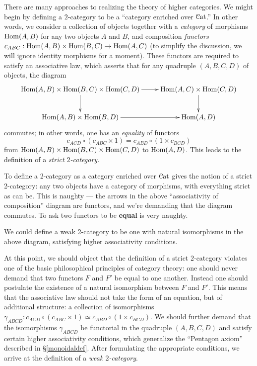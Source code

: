 There are many approaches to realizing the theory of higher categories.
We might begin by defining a $2$-category to be a
``category enriched over $\operatorname{\mathcal{C}at}$.'' In other words, we consider a
collection of objects together with a {\em category} of morphisms
$\operatorname{Hom}(A,B)$ for any two objects $A$ and $B$, and composition {\em
functors} $c_{ABC}: \operatorname{Hom}(A,B) \times \operatorname{Hom}(B,C) \rightarrow
\operatorname{Hom}(A,C)$ (to simplify the discussion, we will ignore identity
morphisms for a moment). These functors are required to satisfy an
associative law, which asserts that for any quadruple $(A,B,C,D)$
of objects, the diagram
$$ \xymatrix{ \Hom(A,B) \times \Hom(B,C) \times \Hom(C,D) \ar[d]
 \ar[r] & \Hom(A,C) \times \Hom(C,D) \ar[d] \\
 \Hom(A,B) \times \Hom(B,D) \ar[r] & \Hom(A,D) }$$
 commutes; in other words, one has an {\em equality} of functors
$$c_{ACD} \circ (c_{ABC} \times 1) = c_{ABD} \circ (1
\times c_{BCD})$$
from $\operatorname{Hom}(A,B) \times \operatorname{Hom}(B,C) \times
\operatorname{Hom}(C,D)$ to $\operatorname{Hom}(A,D)$. This leads to the definition of
a {\it strict $2$-category}.
\begin{shaded}
To define a 2-category as a category enriched over $\operatorname{\mathcal{C}at}$ gives the notion of a strict 2-category: any two objects have a category of morphisms, with everything strict as can be. This is naughty --- the arrows in the above ``associativity of composition'' diagram are functors, and we're demanding that the diagram commutes. To ask two functors to be \textbf{equal} is very naughty.

We could define a weak 2-category to be one with natural isomorphisms in the above diagram, satisfying higher associativity conditions.
\end{shaded}


At this point, we should object that the definition of a strict
$2$-category violates one of the basic philosophical principles of
category theory: one should never demand that two functors $F$ and $F'$ be
equal to one another. Instead one should postulate the existence of a natural
isomorphism between $F$ and $F'$. This means that the associative
law should not take the form of an equation, but of additional
structure: a collection of isomorphisms $\gamma_{ABCD}: c_{ACD} \circ
(c_{ABC} \times 1) \simeq c_{ABD} \circ (1 \times c_{BCD})$. We
should further demand that the isomorphisms $\gamma_{ABCD}$ be
functorial in the quadruple $(A,B,C,D)$ and satisfy
certain higher associativity conditions, which generalize the ``Pentagon axiom''
described in \S \ref{monoidaldef}. After formulating the
appropriate conditions, we arrive at the definition of a {\it weak
$2$-category}.


